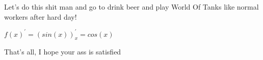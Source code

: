 \documentclass{article}
\begin{document}
Let's do this shit man and go to drink beer and play World Of Tanks like normal workers after hard day!

$f(x)^\prime = ( sin( x))_{x}^\prime =  cos( x)$

	That's all, I hope your ass is satisfied
\end{document}

